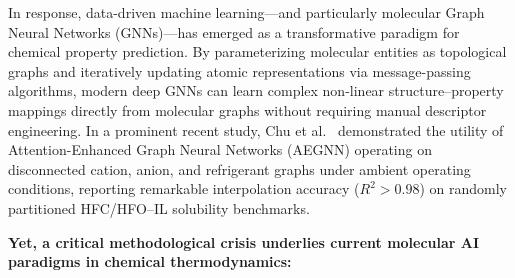 In response, data-driven machine learning---and particularly molecular Graph Neural Networks (GNNs)---has emerged as a transformative paradigm for chemical property prediction. By parameterizing molecular entities as topological graphs and iteratively updating atomic representations via message-passing algorithms, modern deep GNNs can learn complex non-linear structure--property mappings directly from molecular graphs without requiring manual descriptor engineering. In a prominent recent study, Chu et al.~\cite{Chu2024_AEGNN} demonstrated the utility of Attention-Enhanced Graph Neural Networks (AEGNN) operating on disconnected cation, anion, and refrigerant graphs under ambient operating conditions, reporting remarkable interpolation accuracy ($R^2 > 0.98$) on randomly partitioned HFC/HFO--IL solubility benchmarks.

\textbf{Yet, a critical methodological crisis underlies current molecular AI paradigms in chemical thermodynamics:}

